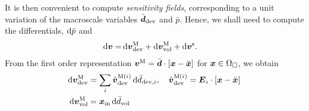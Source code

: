 \documentclass[10pt,a4paper]{article}
\begin{document}
It is then convenient to compute \emph{sensitivity fields}, corresponding to a unit variation of the macroscale variables $\bar{\boldsymbol{d}}_{\mathrm{dev}}$ and $\bar{p}$. Hence, we shall need to compute the differentials, $\operatorname{d \!}\bar p$ and
\begin{align}
    \dif\ta{v}
     = &
    \dif\ta{v}^\macro_\dev + \dif\ta{v}^\macro_\vol + \dif\ta{v}^\fluct.
\label{eq:dv}
\end{align}
From the first order representation $\boldsymbol{v}^{\mathrm{M}} = \bar{\boldsymbol{d}}\cdot[\boldsymbol{x}-\bar{\boldsymbol{x}}]$ for $\boldsymbol{x}\in\Omega_\Box$, we obtain %
\begin{align}
  \operatorname{d \!} \boldsymbol{v}^{\mathrm{M}}_{\mathrm{dev}} &= \sum_{i} \hat{\boldsymbol{v}}^{\mathrm{M}(i)}_{\mathrm{dev}} \operatorname{d \!}\bar{d}_{\mathrm{dev},i}, \quad  \hat{\boldsymbol{v}}^{\mathrm{M}(i)}_{\mathrm{dev}} = \boldsymbol{E}_i \cdot [\boldsymbol{x} - \bar{\boldsymbol{x}}]
    \label{eq216}\\
\operatorname{d \!}\boldsymbol{v}^{\mathrm{M}}_{\mathrm{vol}} &= \boldsymbol{x}_{\mathrm{m}} \operatorname{d \!} \bar{d}_{\mathrm{vol}}
\end{align}
\end{document}
